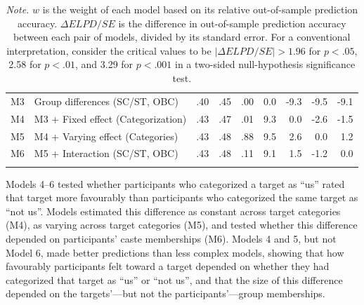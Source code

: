 \documentclass[12pt, a4paper]{article}
\begin{document}
\begin{table}
\begin{tabularx}{\linewidth}{rXr@{~}rrr@{~}r@{~}r@{~}r}
M3                               & Group differences (SC/ST, OBC)      & .40            & .45            & .00                  & {\color[HTML]{E0E0E0} 0.0}  & {\color[HTML]{B2182B} -9.3}  & {\color[HTML]{B2182B} -9.5}  & {\color[HTML]{B2182B} -9.1}  \\
M4                               & M3 + Fixed effect (Categorization)  & .43            & .47            & .01                  & {\color[HTML]{2166AC} 9.3}  & {\color[HTML]{E0E0E0} 0.0}   & {\color[HTML]{D6604D} -2.6}  & {\color[HTML]{E0E0E0} -1.5}  \\
M5                               & M4 + Varying effect (Categories)    & .43            & .48            & .88                  & {\color[HTML]{2166AC} 9.5}  & {\color[HTML]{4393C3} 2.6}   & {\color[HTML]{E0E0E0} 0.0}   & {\color[HTML]{E0E0E0} 1.2}   \\
M6                               & M5 + Interaction (SC/ST, OBC)       & .43            & .48            & .11                  & {\color[HTML]{2166AC} 9.1}  & {\color[HTML]{E0E0E0} 1.5}   & {\color[HTML]{E0E0E0} -1.2}  & {\color[HTML]{E0E0E0} 0.0}  \\ \bottomrule \addlinespace
\end{tabularx}
\label{tab:t3}
\caption*{\textit{Note.} $w$ is the weight of each model based on its relative out-of-sample prediction accuracy. $\Delta\textit{ELPD}/\textit{SE}$ is the difference in out-of-sample prediction accuracy between each pair of models, divided by its standard error. For a conventional interpretation, consider the critical values to be $|\Delta\textit{ELPD}/\textit{SE}| > 1.96$ for $p < .05$, 2.58 for $p < .01$, and 3.29 for $p < .001$ in a two-sided null-hypothesis significance test.}
\end{table}

Models 4--6 tested whether participants who categorized a target as “us” rated that target more favourably than participants who categorized the same target as “not us”. Models estimated this difference as constant across target categories (M4), as varying across target categories (M5), and tested whether this difference depended on participants’ caste memberships (M6). Models 4 and 5, but not Model 6, made better predictions than less complex models, showing that how favourably participants felt toward a target depended on whether they had categorized that target as “us” or “not us”, and that the size of this difference depended on the targets’---but not the participants’---group memberships.
\end{document}
